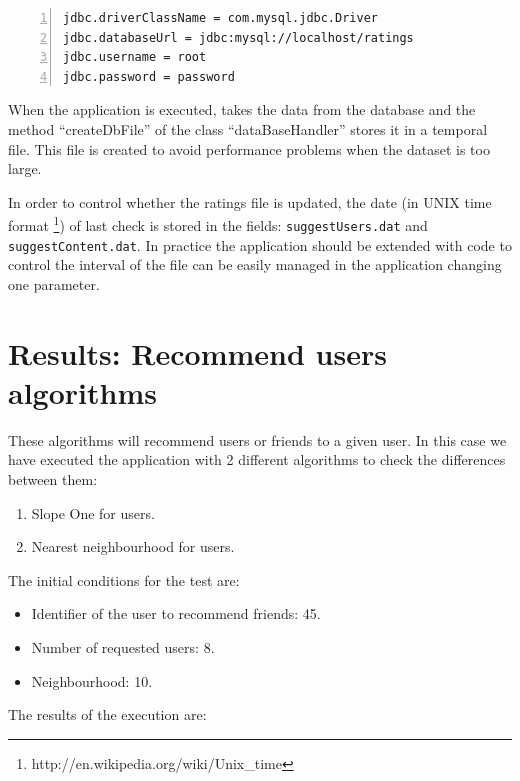 \documentclass[a4paper,10pt]{article}
\begin{document}
\begin{lstlisting}[basicstyle={\small},breaklines=true,language=XML,numbers=left
,numberstyle={\footnotesize}]
jdbc.driverClassName = com.mysql.jdbc.Driver
jdbc.databaseUrl = jdbc:mysql://localhost/ratings
jdbc.username = root
jdbc.password = password
\end{lstlisting}



When the application is executed, takes the data from the database
and the method ``createDbFile'' of the class ``dataBaseHandler''
stores it in a temporal file. This file is created to avoid performance
problems when the dataset is too large.

In order to control whether
the ratings file is updated, the date (in UNIX time format%
\footnote{http://en.wikipedia.org/wiki/Unix\_time%
}) of last check is stored in the fields: \texttt{suggestUsers.dat} and
\texttt{suggestContent.dat}.
In practice the application should be extended with code to control the interval of the file can be easily managed in the application changing one parameter.

%

\section{Results: Recommend users algorithms}

These algorithms will recommend users or friends to a given user.
In this case we have executed the application with 2 different algorithms
to check the differences between them:

\begin{enumerate}
\item Slope One for users.
\item Nearest neighbourhood for users.
\end{enumerate}

The initial conditions for the test are:
\begin{itemize}
\item Identifier of the user to recommend friends: 45.
\item Number of requested users: 8.
\item Neighbourhood: 10.
\end{itemize}


The results of the execution are:
\end{document}
